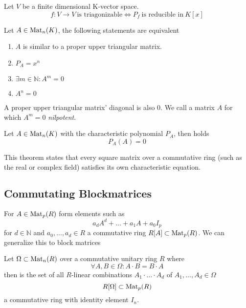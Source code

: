 \begin{proposition}
   Let \(V\) be a finite dimensional K-vector space.
   \[f: V \to V~\text{is triagonizable} \iff P_f~\text{is reducible in}~K[x]\]
\end{proposition}

\begin{proposition}
   Let \(A \in \operatorname{Mat}_n(K)\), the following statements are equivalent
   \begin{enumerate}[label=\roman*, align=Center]
      \item \(A\) is similar to a proper upper triangular matrix.
      \item \(P_A = x^n\)
      \item \(\exists m \in \mathbb{N}: A^m = 0\)
      \item \(A^n = 0\)
   \end{enumerate}
\end{proposition}
\begin{remark}
   A proper upper triangular matrix' diagonal is also 0.
   We call a matrix \(A\) for which \(A^m = 0\) \textit{nilpotent}.
\end{remark}

\begin{theorem}
   Let \(A \in \operatorname{Mat}_n(K)\) with the characteristic polynomial \(P_A\), then holds
   \[P_A(A) = 0\]
\end{theorem}
\begin{remark}
   This theorem states that every square matrix over a commutative ring (such as the real or complex field) satisfies its own characteristic equation.
\end{remark}

\subsection{Commutating Blockmatrices}
For \(A \in \operatorname{Mat}_p(R)\) form elements such as
\[a_dA^d + \ldots + a_1A + a_0I_p\]
for \(d \in \mathbb{N}\) and \(a_0, \ldots, a_d \in R\) a commutative ring \(R[A] \subset \operatorname{Mat}_p(R)\).
We can generalize this to block matrices

\begin{lemma}
   Let \(\Omega \subset \operatorname{Mat}_n(R)\) over a commutative unitary ring \(R\) where
   \[\forall A, B \in \Omega: A \cdot B = B \cdot A\]
   then is the set of all \(R\)-linear combinations \(A_1 \cdot \ldots \cdot A_d\) of \(A_1, \ldots, A_d \in \Omega\)
   \[R[\Omega] \subset \operatorname{Mat}_p(R)\]
    a commutative ring with identity element \(I_n\).
\end{lemma}

